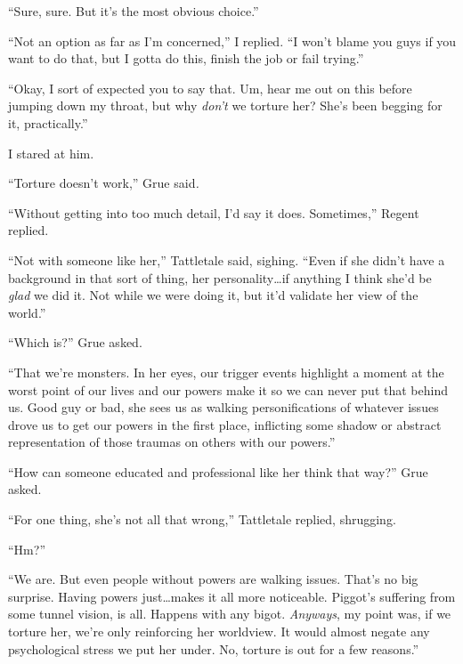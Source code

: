 ``Sure, sure.  But it's the most obvious choice.''



``Not an option as far as I'm concerned,'' I replied.  ``I won't blame you guys if you want to do that, but I gotta do this, finish the job or fail trying.''



``Okay, I sort of expected you to say that.  Um, hear me out on this before jumping down my throat, but why \emph{don't} we torture her?  She's been begging for it, practically.''



I stared at him.



``Torture doesn't work,'' Grue said\emph{.}



``Without getting into too much detail, I'd say it does.  Sometimes,'' Regent replied.



``Not with someone like her,'' Tattletale said, sighing.  ``Even if she didn't have a background in that sort of thing, her personality\ldots if anything I think she'd be \emph{glad} we did it.  Not while we were doing it, but it'd validate her view of the world.''



``Which is?'' Grue asked.



``That we're monsters.  In her eyes, our trigger events highlight a moment at the worst point of our lives and our powers make it so we can never put that behind us.  Good guy or bad, she sees us as walking personifications of whatever issues drove us to get our powers in the first place, inflicting some shadow or abstract representation of those traumas on others with our powers.''



``How can someone educated and professional like her think that way?''  Grue asked.



``For one thing, she's not all that wrong,'' Tattletale replied, shrugging.



``Hm?''



``We are.  But even people without powers are walking issues.  That's no big surprise.  Having powers just\ldots makes it all more noticeable.  Piggot's suffering from some tunnel vision, is all.  Happens with any bigot.  \emph{Anyways}, my point was, if we torture her, we're only reinforcing her worldview.  It would almost negate any psychological stress we put her under.  No, torture is out for a few reasons.''



